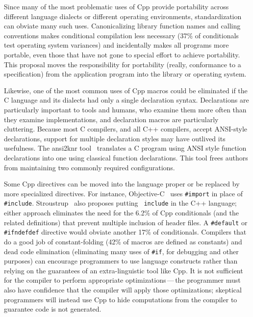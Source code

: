 \documentclass[10pt]{article}
\begin{document}
Since many of the most problematic uses of Cpp provide portability across
different language dialects or different operating environments,
standardization can obviate many such uses.  Canonicalizing library
function names and calling conventions makes conditional compilation less
necessary (37\% of conditionals test operating system variances) and
incidentally makes all programs more portable, even those that have not
gone to special effort to achieve portability.  This proposal moves the
responsibility for portability (really, conformance to a specification)
from the application program into the library or operating system.

Likewise, one of the most common uses of Cpp macros could be eliminated if
the C language and its dialects had only a single declaration syntax.
Declarations are particularly important to tools and humans, who examine
them more often than they examine implementations, and declaration macros are
particularly cluttering.
Because most C compilers, and all C++ compilers, accept ANSI-style
declarations, support for multiple declaration styles may have outlived its
usefulness.  The ansi2knr tool~\cite{Deutsch90} translates a C program
using ANSI style function declarations into one using classical function
declarations.  This tool frees authors from maintaining two commonly
required configurations.

Some Cpp directives can be moved into the language proper or be replaced by
more specialized directives.  For instance, Objective-C~\cite{CoxN91} uses
{\tt \#import} in place of {\tt \#include}.
Stroustrup~\cite{Stroustrup-DesignEvolution} also proposes putting {\tt
include} in the C++ language; either approach eliminates the need for the
6.2\% of Cpp conditionals (and the related definitions) that prevent
multiple inclusion of header files.  A {\tt \#default} or {\tt \#ifndefdef}
directive would obviate another 17\% of conditionals.  Compilers that do a
good job of constant-folding (42\% of macros are defined as constants) and
dead code elimination (eliminating many uses of {\tt \#if}, for debugging
and other purposes) can encourage programmers to use language constructs
rather than relying on the guarantees of an extra-linguistic tool like Cpp.
It is not sufficient for the compiler to perform appropriate
optimizations\,---\,the programmer must also have confidence that the
compiler will apply those optimizations; skeptical programmers will instead
use Cpp to hide computations from the compiler to guarantee code is not
generated.
\end{document}
